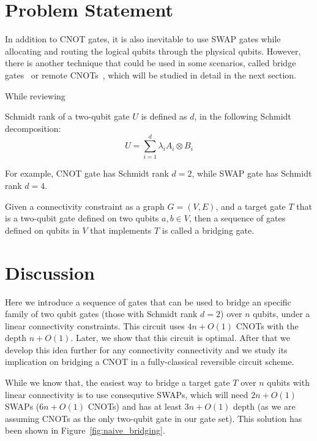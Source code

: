\chapter{Problem Statement}\label{chap:problem_statement}

In addition to CNOT gates, it is also inevitable to use SWAP gates while allocating and routing the logical qubits through the physical qubits. However, there is another technique that could be used in some scenarios, called bridge gates~\cite{sivarajah2021,itoko2019,shende2006,siraichi2018} or remote CNOTs~\cite{zhou2020, nash2020}, which will be studied in detail in the next section.

While reviewing 

\begin{definition}
  Schmidt rank of a two-qubit gate $U$ is defined as $d$, in the following Schmidt decomposition:
  \begin{equation}
    U = \sum_{i=1}^{d} \lambda_i A_i \otimes B_i
  \end{equation}
\end{definition}
  
For example, CNOT gate has Schmidt rank $d = 2$, while SWAP gate has Schmidt rank $d = 4$.

\begin{definition}
  Given a connectivity constraint as a graph $G = (V, E)$, and a target gate $T$ that is a two-qubit gate defined on two qubits $a, b \in V$, then a sequence of gates defined on qubits in $V$ that implements $T$ is called a bridging gate. %
\end{definition}


\chapter{Discussion}\label{chap:discussion}

Here we introduce a sequence of gates that can be used to bridge an specific family of two qubit gates (those with Schmidt rank $d = 2$) over $n$ qubits, under a linear connectivity constraints. This circuit uses $4n + O(1)$ CNOTs with the depth $n + O(1)$. Later, we show that this circuit is optimal. After that we develop this idea further for any connectivity connectivity and we study its implication on bridging a CNOT in a fully-classical reversible circuit scheme.

While we know that, the easiest way to bridge a target gate $T$ over $n$ qubits with linear connectivity is to use consequtive SWAPs, which will need $2n + O(1)$ SWAPs ($6n + O(1)$ CNOTs) and has at least $3n + O(1)$ depth (as we are assuming CNOTs as the only two-qubit gate in our gate set). This solution has been shown in Figure~\ref{fig:naive_bridging}.

